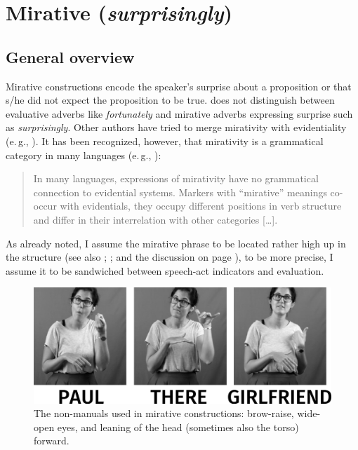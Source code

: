 \section{Mirative (\textit{surprisingly})}


\subsection{General overview}

Mirative constructions encode the speaker's surprise about a proposition or that s/he did not expect the proposition to be true. \citet[85]{cinque1999adverbs} does not distinguish between evaluative adverbs like \textit{fortunately} and mirative adverbs expressing surprise such as \textit{surprisingly}. Other authors have tried to merge mirativity with evidentiality (e.\,g., \citealt{guentcheva1996tro}). It has been recognized, however, that mirativity is a grammatical category in many languages (e.\,g., \citealt{delancey2001mirative, aikhenval2009evidentiality}):

\begin{quote}
In many languages, expressions of mirativity have no grammatical connection to evidential systems. Markers with ``mirative'' meanings co-occur with evidentials, they occupy different positions in verb structure and differ in their interrelation with other categories [\dots ]. \citep[436]{aikhenvald2012essence}
\end{quote}

\noindent As already noted, I assume the mirative phrase to be located rather high up in the structure (see also \citealt[317]{testcari2013}; \citealt[57--59]{varley2014evidentiality}; \citealt{alcazar2016minor} and the discussion on page \pageref{mirmir}), to be more precise, I assume it to be sandwiched between speech-act indicators and evaluation.

\begin{figure}[bt]
\centering
	\includegraphics[width=1.0\textwidth]{mirative-nnmtwosw.jpg}
	\caption{The non-manuals used in mirative constructions: brow-raise, wide-open eyes, and leaning of the head (sometimes also the torso) forward.}
	\label{fig:mirative}
\end{figure}

